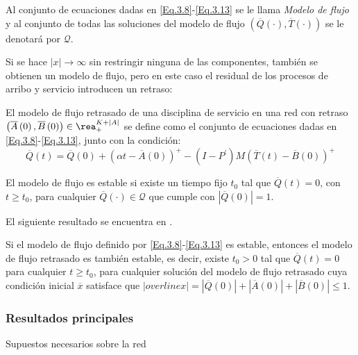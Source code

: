 Al conjunto de ecuaciones dadas en \ref{Eq.3.8}-\ref{Eq.3.13} se
le llama {\em Modelo de flujo} y al conjunto de todas las
soluciones del modelo de flujo
$\left(\overline{Q}\left(\cdot\right),\overline{T}
\left(\cdot\right)\right)$ se le denotar\'a por $\mathcal{Q}$.

Si se hace $|x|\rightarrow\infty$ sin restringir ninguna de las
componentes, tambi\'en se obtienen un modelo de flujo, pero en
este caso el residual de los procesos de arribo y servicio
introducen un retraso:

\begin{Def}
El modelo de flujo retrasado de una disciplina de servicio en una
red con retraso
$\left(\overline{A}\left(0\right),\overline{B}\left(0\right)\right)\in\rea_{+}^{K+|A|}$
se define como el conjunto de ecuaciones dadas en
\ref{Eq.3.8}-\ref{Eq.3.13}, junto con la condici\'on:
\begin{equation}\label{CondAd.FluidModel}
\overline{Q}\left(t\right)=\overline{Q}\left(0\right)+\left(\alpha
t-\overline{A}\left(0\right)\right)^{+}-\left(I-P^{'}\right)M\left(\overline{T}\left(t\right)-\overline{B}\left(0\right)\right)^{+}
\end{equation}
\end{Def}

\begin{Def}
El modelo de flujo es estable si existe un tiempo fijo $t_{0}$ tal
que $\overline{Q}\left(t\right)=0$, con $t\geq t_{0}$, para
cualquier $\overline{Q}\left(\cdot\right)\in\mathcal{Q}$ que
cumple con $|\overline{Q}\left(0\right)|=1$.
\end{Def}

El siguiente resultado se encuentra en \cite{Chen}.
\begin{Lemma}
Si el modelo de flujo definido por \ref{Eq.3.8}-\ref{Eq.3.13} es
estable, entonces el modelo de flujo retrasado es tambi\'en
estable, es decir, existe $t_{0}>0$ tal que
$\overline{Q}\left(t\right)=0$ para cualquier $t\geq t_{0}$, para
cualquier soluci\'on del modelo de flujo retrasado cuya
condici\'on inicial $\overline{x}$ satisface que
$|overline{x}|=|\overline{Q}\left(0\right)|+|\overline{A}\left(0\right)|+|\overline{B}\left(0\right)|\leq1$.
\end{Lemma}

\subsubsection{Resultados principales}
Supuestos necesarios sobre la red

